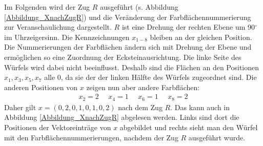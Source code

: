 \documentclass[12pt,a4paper, usenames, dvipsnames]{article}
\theoremstyle{mystyle}
\theoremstyle{definition}
\begin{document}
Im Folgenden wird der Zug $R$ ausgeführt (s. Abbildung \ref{Abbildung_XnachZugR}) und die Veränderung der Farbflächennummerierung zur Veranschaulichung dargestellt. $R$ ist eine Drehung der rechten Ebene um 90$^\circ$ im Uhrzeigersinn. 
Die Kennzeichnungen $x_{1-8}$ bleiben an der gleichen Position. Die Nummerierungen  der Farbflächen ändern sich mit Drehung der Ebene und ermöglichen so eine Zuordnung der Ecksteinausrichtung. 
Die linke Seite des Würfels wird dabei nicht beeinflusst. Deshalb sind die Flächen an den Positionen $x_1, x_3, x_5, x_7$ alle 0, da sie der der linken Hälfte des Würfels zugeordnet sind.
Die anderen Positionen von $x$ zeigen nun aber andere Farbflächen: 
\begin{align*}
x_2 = 2 \ \ \ \ \ \ x_4 = 1 \ \ \ \ \ \ x_6 = 1 \ \ \ \ \ \ x_8 = 2  
\end{align*}
Daher gilt $x = (0, 2, 0, 1, 0, 1, 0, 2)$ nach dem Zug $R$. Das kann auch in Abbildung \ref{Abbildung_XnachZugR} abgelesen werden. Links sind dort die Positionen der Vektoreinträge von $x$ abgebildet und rechts sieht man den Würfel mit den Farbflächennummerierungen, nachdem der Zug $R$ ausgeführt wurde.
\end{document}
